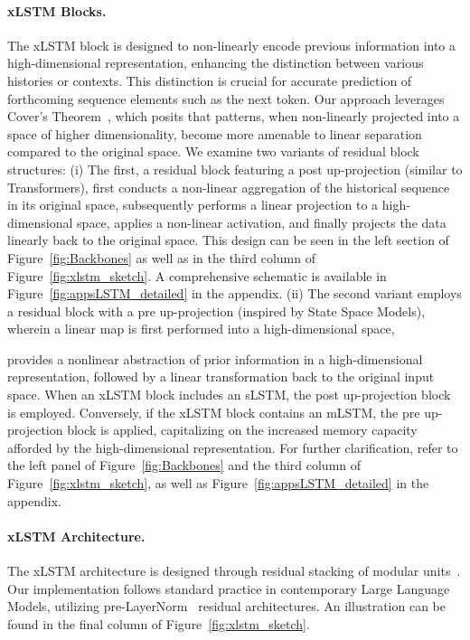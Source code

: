 \paragraph{xLSTM Blocks.}
\label{sec:xLSTMblock}
The xLSTM block is designed to non-linearly encode previous information into a high-dimensional representation, enhancing the distinction between various histories or contexts. This distinction is crucial for accurate prediction of forthcoming sequence elements such as the next token. Our approach leverages Cover’s Theorem~\citep{Cover:65}, which posits that patterns, when non-linearly projected into a space of higher dimensionality, become more amenable to linear separation compared to the original space. We examine two variants of residual block structures: (i) The first, a residual block featuring a post up-projection (similar to Transformers), first conducts a non-linear aggregation of the historical sequence in its original space, subsequently performs a linear projection to a high-dimensional space, applies a non-linear activation, and finally projects the data linearly back to the original space. This design can be seen in the left section of Figure~\ref{fig:Backbones}
as well as in the third column of Figure~\ref{fig:xlstm_sketch}.
A comprehensive schematic is available in Figure~\ref{fig:appsLSTM_detailed}
in the appendix. (ii) The second variant employs a residual block with a pre up-projection (inspired by State Space Models), wherein a linear map is first performed into a high-dimensional space,

provides a nonlinear abstraction of prior information in a high-dimensional representation, followed by a linear transformation back to the original input space. When an xLSTM block includes an sLSTM, the post up-projection block is employed. Conversely, if the xLSTM block contains an mLSTM, the pre up-projection block is applied, capitalizing on the increased memory capacity afforded by the high-dimensional representation. For further clarification, refer to the left panel of Figure~\ref{fig:Backbones} and the third column of Figure~\ref{fig:xlstm_sketch}, as well as Figure~\ref{fig:appsLSTM_detailed} in the appendix.

\paragraph{xLSTM Architecture. }
\label{sec:xLSTMarchitecure}
The xLSTM architecture is designed through residual stacking of modular units~\citep{Srivastava:15,He:16}. Our implementation follows standard practice in contemporary Large Language Models, utilizing pre-LayerNorm~\citep{Ba:16b} residual architectures. An illustration can be found in the final column of Figure~\ref{fig:xlstm_sketch}.

